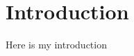 
\chapter*{Introduction}
\ifpdf
    \graphicspath{{Chapter1/Figs/Raster/}{Chapter1/Figs/PDF/}{Chapter1/Figs/}}
\else
    \graphicspath{{Chapter1/Figs/Vector/}{Chapter1/Figs/}}
\fi
Here is my introduction